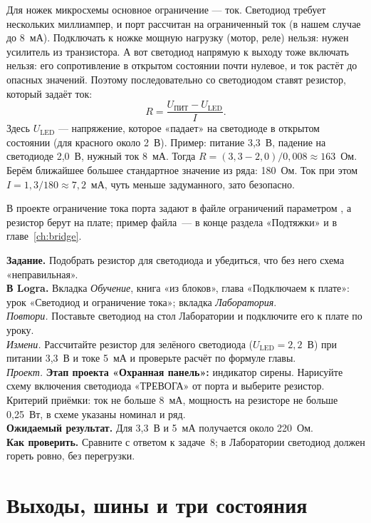 Для ножек микросхемы основное ограничение --- ток. Светодиод требует
нескольких миллиампер, и порт рассчитан на ограниченный ток (в нашем случае
до 8~мА). Подключать к ножке мощную нагрузку (мотор, реле) нельзя: нужен
усилитель из транзистора. А вот светодиод напрямую к выходу тоже включать
нельзя: его сопротивление в открытом состоянии почти нулевое, и ток растёт до
опасных значений. Поэтому последовательно со светодиодом ставят резистор,
который задаёт ток:
\[
  R = \frac{U_\text{ПИТ} - U_\text{LED}}{I}.
\]
Здесь $U_\text{LED}$ --- напряжение, которое «падает» на светодиоде в
открытом состоянии (для красного около 2~В). Пример: питание 3,3~В, падение на
светодиоде 2,0~В, нужный ток 8~мА. Тогда
$R = (3{,}3-2{,}0)/0{,}008 \approx 163$~Ом. Берём ближайшее большее
стандартное значение из ряда: 180~Ом. Ток при этом
$I = 1{,}3/180 \approx 7{,}2$~мА, чуть меньше задуманного, зато безопасно.

В проекте ограничение тока порта задают в файле ограничений параметром
, а резистор берут на плате; пример файла~--- в конце раздела
«Подтяжки» и в главе~\ref{ch:bridge}.

\begin{diybox}
\textbf{Задание.} Подобрать резистор для светодиода и убедиться, что без
него схема «неправильная».\\
\textbf{В Logra.} Вкладка \emph{Обучение}, книга «из блоков», глава
«Подключаем к плате»: урок «Светодиод и ограничение тока»; вкладка
\emph{Лаборатория}.\\
 \emph{Повтори.} Поставьте светодиод на стол Лаборатории и подключите
его к плате по уроку.\\
 \emph{Измени.} Рассчитайте резистор для зелёного светодиода
($U_\text{LED}=2{,}2$~В) при питании 3,3~В и токе 5~мА и проверьте расчёт
по формуле главы.\\
 \emph{Проект.} \textbf{Этап проекта «Охранная панель»:} индикатор
сирены. Нарисуйте схему включения светодиода «ТРЕВОГА» от порта и выберите
резистор. Критерий приёмки: ток не больше 8~мА, мощность на резисторе не
больше 0,25~Вт, в схеме указаны номинал и ряд.\\
\textbf{Ожидаемый результат.} Для 3,3~В и 5~мА получается около 220~Ом.\\
\textbf{Как проверить.} Сравните с ответом к задаче~8; в Лаборатории светодиод
должен гореть ровно, без перегрузки.
\end{diybox}

\section{Выходы, шины и три состояния}


